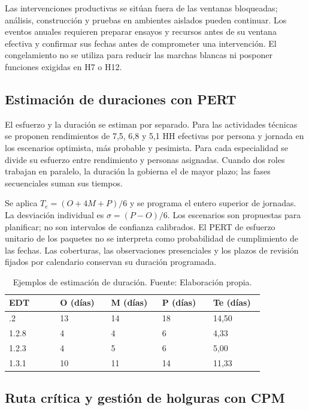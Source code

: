 \documentclass[11pt]{article}
\begin{document}
Las intervenciones productivas se sitúan fuera de las ventanas bloqueadas; análisis, construcción y pruebas en ambientes aislados pueden continuar. Los eventos anuales requieren preparar ensayos y recursos antes de su ventana efectiva y confirmar sus fechas antes de comprometer una intervención. El congelamiento no se utiliza para reducir las marchas blancas ni posponer funciones exigidas en H7 o H12.

\subsection{Estimación de duraciones con PERT}

El esfuerzo y la duración se estiman por separado. Para las actividades técnicas se proponen rendimientos de 7,5, 6,8 y 5,1 HH efectivas por persona y jornada en los escenarios optimista, más probable y pesimista. Para cada especialidad se divide su esfuerzo entre rendimiento y personas asignadas. Cuando dos roles trabajan en paralelo, la duración la gobierna el de mayor plazo; las fases secuenciales suman sus tiempos.

Se aplica $T_e=(O+4M+P)/6$ y se programa el entero superior de jornadas. La desviación individual es $\sigma=(P-O)/6$. Los escenarios son propuestas para planificar; no son intervalos de confianza calibrados. El PERT de esfuerzo unitario de los paquetes no se interpreta como probabilidad de cumplimiento de las fechas. Las coberturas, las observaciones presenciales y los plazos de revisión fijados por calendario conservan su duración programada.

\begingroup
\small
\begin{longtable}{@{}p{0.18\linewidth}p{0.18\linewidth}p{0.18\linewidth}p{0.18\linewidth}p{0.18\linewidth}@{}}
\caption[Ejemplos de estimación de duración]{Ejemplos de estimación de duración. Fuente: Elaboración propia.}\label{tab:t15-12}\\
\toprule
\textbf{EDT} & \textbf{O (días)} & \textbf{M (días)} & \textbf{P (días)} & \textbf{Te (días)} \\
\midrule
\endhead
\bottomrule
\endlastfoot
1.2.2 & 13 & 14 & 18 & 14,50 \\
1.2.8 & 4 & 4 & 6 & 4,33 \\
1.2.3 & 4 & 5 & 6 & 5,00 \\
1.3.1 & 10 & 11 & 14 & 11,33 \\
\end{longtable}
\endgroup

\subsection{Ruta crítica y gestión de holguras con CPM}
\end{document}

